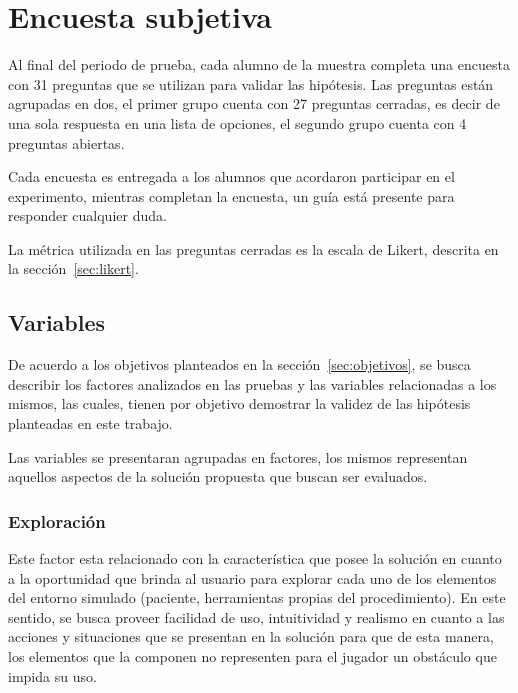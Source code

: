 \section{Encuesta subjetiva}
\label{sec:subjetiva}

Al final del periodo de prueba, cada alumno de la muestra completa una encuesta
con 31 preguntas que se utilizan para validar las hipótesis. Las preguntas están agrupadas en dos, el primer grupo cuenta
con 27 preguntas cerradas, es decir de una sola respuesta en una lista de
opciones, el segundo grupo cuenta con 4 preguntas abiertas.

Cada encuesta es entregada a los alumnos que acordaron participar en el
experimento, mientras completan la encuesta, un guía está presente para
responder cualquier duda.

La métrica utilizada en las preguntas cerradas es la escala de Likert, descrita
en la sección~\ref{sec:likert}.

\subsection{Variables}
\label{sec:variables}

De acuerdo a los objetivos planteados en la sección~\ref{sec:objetivos}, se
busca describir los factores analizados en las pruebas y las variables
relacionadas a los mismos, las cuales, tienen por objetivo demostrar la validez
de las hipótesis planteadas en este trabajo.

Las variables se presentaran agrupadas en factores, los mismos representan
aquellos aspectos de la solución propuesta que buscan ser evaluados.

\subsubsection{Exploración}
\label{sec:sub_exploracion}

Este factor esta relacionado con la característica que posee la solución en
cuanto a la oportunidad que brinda al usuario para explorar cada uno de los
elementos del entorno simulado (paciente, herramientas propias del
procedimiento). En este sentido, se busca proveer facilidad de uso, intuitividad
y realismo en cuanto a las acciones y situaciones que se presentan en la
solución para que de esta manera, los elementos que la componen no representen
para el jugador un obstáculo que impida su uso.

